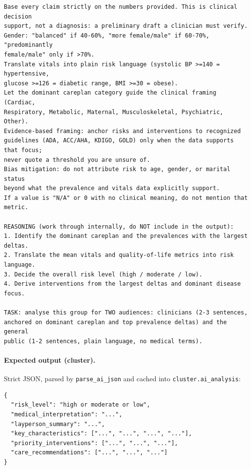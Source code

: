 \begin{lstlisting}[style=pythonstyle]
Base every claim strictly on the numbers provided. This is clinical decision
support, not a diagnosis: a preliminary draft a clinician must verify.
Gender: "balanced" if 40-60%, "more female/male" if 60-70%, "predominantly
female/male" only if >70%.
Translate vitals into plain risk language (systolic BP >=140 = hypertensive,
glucose >=126 = diabetic range, BMI >=30 = obese).
Let the dominant careplan category guide the clinical framing (Cardiac,
Respiratory, Metabolic, Maternal, Musculoskeletal, Psychiatric, Other).
Evidence-based framing: anchor risks and interventions to recognized
guidelines (ADA, ACC/AHA, KDIGO, GOLD) only when the data supports that focus;
never quote a threshold you are unsure of.
Bias mitigation: do not attribute risk to age, gender, or marital status
beyond what the prevalence and vitals data explicitly support.
If a value is "N/A" or 0 with no clinical meaning, do not mention that metric.

REASONING (work through internally, do NOT include in the output):
1. Identify the dominant careplan and the prevalences with the largest deltas.
2. Translate the mean vitals and quality-of-life metrics into risk language.
3. Decide the overall risk level (high / moderate / low).
4. Derive interventions from the largest deltas and dominant disease focus.

TASK: analyse this group for TWO audiences: clinicians (2-3 sentences,
anchored on dominant careplan and top prevalence deltas) and the general
public (1-2 sentences, plain language, no medical terms).
\end{lstlisting}

\paragraph{Expected output (cluster).} Strict JSON, parsed by \texttt{parse\_ai\_json} and cached into \texttt{cluster.ai\_analysis}:

\vspace{0.25cm}

\begin{lstlisting}[style=pythonstyle]
{
  "risk_level": "high or moderate or low",
  "medical_interpretation": "...",
  "layperson_summary": "...",
  "key_characteristics": ["...", "...", "...", "..."],
  "priority_interventions": ["...", "...", "..."],
  "care_recommendations": ["...", "...", "..."]
}
\end{lstlisting}

